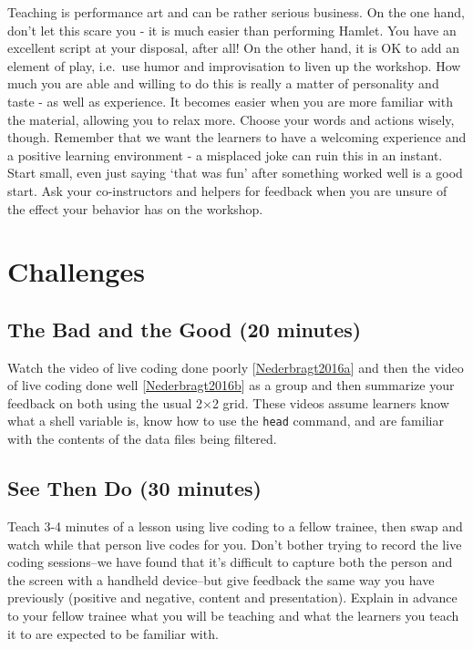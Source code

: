 \documentclass[10pt,statementpaper]{memoir}
\begin{document}
Teaching is performance art and can be rather serious business. On the
one hand, don't let this scare you - it is much easier than performing
Hamlet. You have an excellent script at your disposal, after all! On the
other hand, it is OK to add an element of play, i.e.~use humor and
improvisation to liven up the workshop. How much you are able and
willing to do this is really a matter of personality and taste - as well
as experience. It becomes easier when you are more familiar with the
material, allowing you to relax more. Choose your words and actions
wisely, though. Remember that we want the learners to have a welcoming
experience and a positive learning environment - a misplaced joke can
ruin this in an instant. Start small, even just saying `that was fun'
after something worked well is a good start. Ask your co-instructors and
helpers for feedback when you are unsure of the effect your behavior has
on the workshop.

\section{Challenges}\label{challenges-7}

\subsection{The Bad and the Good (20
minutes)}\label{the-bad-and-the-good-20-minutes}

Watch the video of live coding done poorly
{[}\href{biblio.html\#live-coding-bad}{Nederbragt2016a}{]} and then the
video of live coding done well
{[}\href{biblio.html\#live-coding-good}{Nederbragt2016b}{]} as a group
and then summarize your feedback on both using the usual 2×2 grid. These
videos assume learners know what a shell variable is, know how to use
the \texttt{head} command, and are familiar with the contents of the
data files being filtered.

\subsection{See Then Do (30 minutes)}\label{see-then-do-30-minutes}

Teach 3-4 minutes of a lesson using live coding to a fellow trainee,
then swap and watch while that person live codes for you. Don't bother
trying to record the live coding sessions--we have found that it's
difficult to capture both the person and the screen with a handheld
device--but give feedback the same way you have previously (positive and
negative, content and presentation). Explain in advance to your fellow
trainee what you will be teaching and what the learners you teach it to
are expected to be familiar with.
\end{document}
